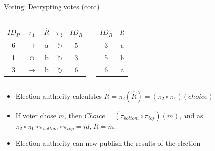 \documentclass{beamer}
\begin{document}
\begin{frame}{Voting: Decrypting votes (cont)}
	\begin{columns}
		\begin{center}
			\begin{tabular}{|c|c|c|c|c|}
				\hline
				$ID_P$ & $\pi_1$ & $\hat{R}$ & $\pi_2$ & $ID_R$ \\
				\hline
				6 & $\rightarrow$       & a & $\circlearrowright$ & 5 \\
				1 & $\circlearrowright$ & b & $\circlearrowright$ & 3 \\
				3 & $\rightarrow$       & b & $\circlearrowright$ & 6 \\
				\hline
			\end{tabular}
		\end{center}
		\begin{center}
			\begin{tabular}{|c|c|}
				\hline
				$ID_R$ & $R$ \\
				\hline
				3 & a \\
				5 & b \\
				6 & a \\
				\hline
			\end{tabular}
		\end{center}
	\end{columns}

	\begin{itemize}
		\item Election authority calculates $R = \pi_2(\hat{R}) =
			(\pi_2 \circ \pi_1)(choice)$
		\item If voter chose $m$, then $Choice = (\pi_{bottom} \circ
			\pi_{top})(m)$, and as $\pi_{2} \circ \pi_{1}
			\circ \pi_{bottom} \circ \pi_{top} = id$, $R = m$.
		\item Election authority can now publish the results of the election
	\end{itemize}
\end{frame}
\end{document}
